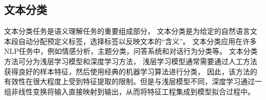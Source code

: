 




\subsection{文本分类}
文本分类任务是语义理解任务的重要组成部分，
文本分类是为给定的自然语言文本段自动分配预定义标签，选择标签以反映文本的“含义”。
文本分类应用在许多NLP任务中，例如情感分析，主题分类，问答系统和对话行为分类等。
文本分类方法可分为浅层学习模型和深度学习方法，
浅层学习模型通常需要通过人工方法获得良好的样本特征，然后使用经典的机器学习算法进行分类，
因此，该方法的有效性在很大程度上受到特征提取的限制。但是与浅层模型不同，深度学习通过一组非线性变换将输入直接映射到输出，从而将特征工程集成到模型拟合过程中。

